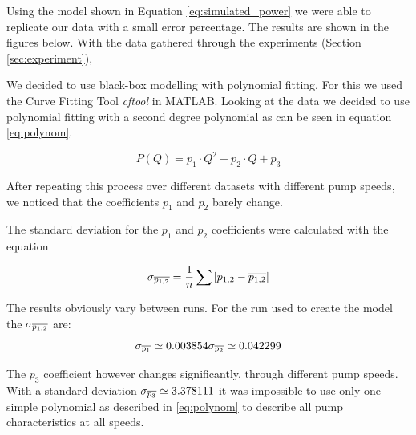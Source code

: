 Using the model shown in Equation \ref{eq:simulated_power} we were able to replicate our data with a small error percentage. The results
are shown in the figures below.
\newpage
With the data gathered through the experiments (Section \ref{sec:experiment}),

We decided to use black-box modelling with polynomial fitting.
For this we used the Curve Fitting Tool \cite{cftool} \textit{cftool} 
 in MATLAB.
Looking at the data we decided to use polynomial fitting with a second degree polynomial
as can be seen in equation \ref{eq:polynom}.

\begin{equation}
	 P(Q) = p_1 \cdot Q^2 + p_2 \cdot Q + p_3
	 \label{eq:polynom}
\end{equation}

After repeating this process over different datasets with different pump speeds,
we noticed that the coefficients $p_1$ and $p_2$ barely change.

The standard deviation for the $p_1$ and $p_2$ coefficients were calculated with the equation 

\begin{equation}
	\sigma_{\overline{p_{1,2}}} = \dfrac{1}{n}\sum |p_{1,2}-\overline{p_{1,2}}|
	\label{eq:avedev}
\end{equation}

The results obviously vary between runs. For the run used to create the model the $\sigma_{\overline{p_{1,2}}}$ are:
\begin{equation}
	\sigma_{\mean{p_1}} \simeq 0.003854$$
	
	$$\sigma_{\mean{p_2}} \simeq 0.042299
\end{equation}

The $p_3$ coefficient however changes significantly, through different pump speeds.
With a standard deviation $\sigma_{\overline{p_3}} \simeq 3.378111$ it was impossible to use only one simple polynomial as described in 
\ref{eq:polynom} to describe all pump characteristics at all speeds.

